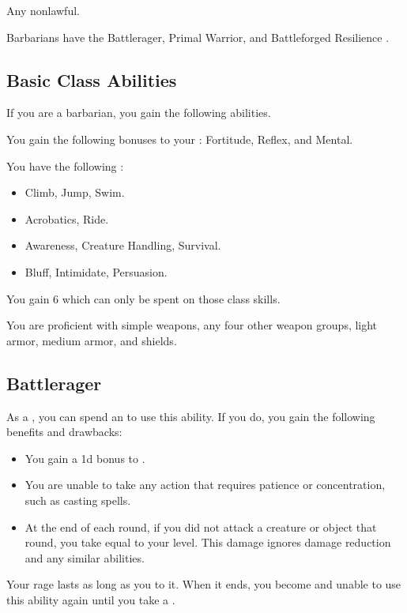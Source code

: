      Any nonlawful.

     Barbarians have the Battlerager, Primal Warrior, and Battleforged Resilience .

    \subsection{Basic Class Abilities}
        If you are a barbarian, you gain the following abilities.

        You gain the following bonuses to your :  Fortitude,  Reflex, and  Mental.

        You have the following :
        \begin{itemize}
            \item {} Climb, Jump, Swim.
            \item {} Acrobatics, Ride.
            \item {} Awareness, Creature Handling, Survival.
            \item {} Bluff, Intimidate, Persuasion.
        \end{itemize}
        You gain 6  which can only be spent on those class skills.

        You are proficient with simple weapons, any four other weapon groups, light armor, medium armor, and shields.

    \subsection{Battlerager}\label{Rage}

        As a , you can spend an  to use this ability.
        If you do, you gain the following benefits and drawbacks:
        \begin{itemize}
            \item You gain a \plus1d bonus to .
            \item You are unable to take any action that requires patience or concentration, such as casting spells.
            \item At the end of each round, if you did not attack a creature or object that round, you take  equal to your level.
                This damage ignores damage reduction and any similar abilities.
        \end{itemize}
        Your rage lasts as long as you  to it.
        When it ends, you become \fatigued and unable to use this ability again until you take a .

